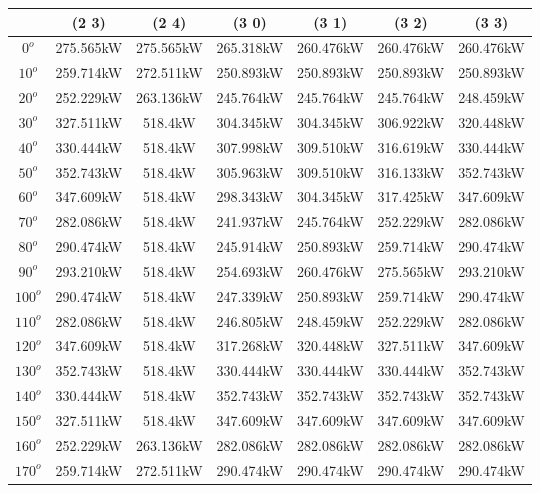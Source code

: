         \begin{table}[H]
        	\centering
        	\begin{tabular}{|c|c|c|c|c|c|c|} \hline
        			& (2 3)		& (2 4)		& (3 0)		& (3 1)		& (3 2)		& (3 3)		\\ \hline
		$0^o$	& 275.565kW	& 275.565kW	& 265.318kW	& 260.476kW	& 260.476kW	& 260.476kW	\\ \hline
		$10^o$	& 259.714kW	& 272.511kW	& 250.893kW	& 250.893kW	& 250.893kW	& 250.893kW	\\ \hline
		$20^o$	& 252.229kW	& 263.136kW	& 245.764kW	& 245.764kW	& 245.764kW	& 248.459kW	\\ \hline
		$30^o$	& 327.511kW	& 518.4kW	& 304.345kW	& 304.345kW	& 306.922kW	& 320.448kW	\\ \hline
		$40^o$	& 330.444kW	& 518.4kW	& 307.998kW	& 309.510kW	& 316.619kW	& 330.444kW	\\ \hline
		$50^o$	& 352.743kW	& 518.4kW	& 305.963kW	& 309.510kW	& 316.133kW	& 352.743kW	\\ \hline
		$60^o$	& 347.609kW	& 518.4kW	& 298.343kW	& 304.345kW	& 317.425kW	& 347.609kW	\\ \hline
		$70^o$	& 282.086kW	& 518.4kW	& 241.937kW	& 245.764kW	& 252.229kW	& 282.086kW	\\ \hline
		$80^o$	& 290.474kW	& 518.4kW	& 245.914kW	& 250.893kW	& 259.714kW	& 290.474kW	\\ \hline
		$90^o$	& 293.210kW	& 518.4kW	& 254.693kW	& 260.476kW	& 275.565kW	& 293.210kW	\\ \hline
		$100^o$	& 290.474kW	& 518.4kW	& 247.339kW	& 250.893kW	& 259.714kW	& 290.474kW	\\ \hline
		$110^o$	& 282.086kW	& 518.4kW	& 246.805kW	& 248.459kW	& 252.229kW	& 282.086kW	\\ \hline
		$120^o$	& 347.609kW	& 518.4kW	& 317.268kW	& 320.448kW	& 327.511kW	& 347.609kW	\\ \hline
		$130^o$	& 352.743kW	& 518.4kW	& 330.444kW	& 330.444kW	& 330.444kW	& 352.743kW	\\ \hline
		$140^o$	& 330.444kW	& 518.4kW	& 352.743kW	& 352.743kW	& 352.743kW	& 352.743kW	\\ \hline
		$150^o$	& 327.511kW	& 518.4kW	& 347.609kW	& 347.609kW	& 347.609kW	& 347.609kW	\\ \hline
		$160^o$	& 252.229kW	& 263.136kW	& 282.086kW	& 282.086kW	& 282.086kW	& 282.086kW	\\ \hline
		$170^o$	& 259.714kW	& 272.511kW	& 290.474kW	& 290.474kW	& 290.474kW	& 290.474kW	\\ \hline

\end{tabular}
\end{table}
